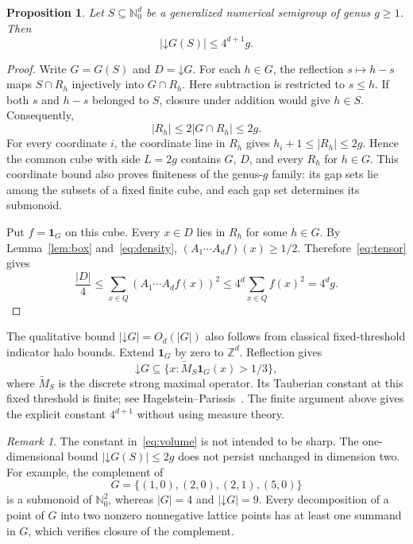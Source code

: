 \documentclass[11pt]{article}
\newtheorem{proposition}[theorem]{Proposition}
\theoremstyle{remark}
\newtheorem{remark}[theorem]{Remark}
\newcommand{\N}{\mathbb N_0}
\newcommand{\ind}{\mathbf 1}
\begin{document}
\begin{proposition}\label{prop:volume}
Let $S\subseteq\N^d$ be a generalized numerical semigroup of genus $g\ge1$.
Then
\begin{equation}\label{eq:volume}
 |\mathord\downarrow G(S)|\le4^{d+1}g.
\end{equation}
\end{proposition}
\begin{proof}
Write $G=G(S)$ and $D=\mathord\downarrow G$. For each $h\in G$,
the reflection $s\mapsto h-s$ maps $S\cap R_h$ injectively into
$G\cap R_h$. Here subtraction is restricted to $s\le h$.
If both $s$ and $h-s$ belonged to $S$, closure under addition would
give $h\in S$. Consequently,
\begin{equation}\label{eq:density}
 |R_h|\le2|G\cap R_h|\le2g.
\end{equation}
For every coordinate $i$, the coordinate line in $R_h$ gives
$h_i+1\le|R_h|\le2g$. Hence the common cube with side $L=2g$
contains $G$, $D$, and every $R_h$ for $h\in G$.
This coordinate bound also proves finiteness of the genus-$g$ family:
its gap sets lie among the subsets of a fixed finite cube, and each gap
set determines its submonoid.

Put $f=\ind_G$ on this cube. Every $x\in D$ lies in $R_h$ for some
$h\in G$. By Lemma~\ref{lem:box} and~\eqref{eq:density},
$(A_1\cdots A_d f)(x)\ge1/2$. Therefore~\eqref{eq:tensor} gives
\[
 \frac{|D|}{4}\le\sum_{x\in Q}(A_1\cdots A_d f(x))^2
 \le4^d\sum_{x\in Q}f(x)^2=4^dg.
\]
\end{proof}

The qualitative bound $|\mathord\downarrow G|=O_d(|G|)$ also follows
from classical fixed-threshold indicator halo bounds. Extend $\ind_G$
by zero to $\mathbb Z^d$. Reflection gives
\[
 \mathord\downarrow G\subseteq
 \{x:\widetilde M_S\ind_G(x)>1/3\},
\]
where $\widetilde M_S$ is the discrete strong maximal operator. Its
Tauberian constant at this fixed threshold is finite; see
Hagelstein--Parissis~\cite[Lemma~1]{HP}. The finite argument above gives
the explicit constant $4^{d+1}$ without using measure theory.

\begin{remark}\label{rem:example}
The constant in~\eqref{eq:volume} is not intended to be sharp.
The one-dimensional bound $|\mathord\downarrow G(S)|\le2g$ does not
persist unchanged in dimension two. For example, the complement of
\[
 G=\{(1,0),(2,0),(2,1),(5,0)\}
\]
is a submonoid of $\N^2$, whereas $|G|=4$ and
$|\mathord\downarrow G|=9$. Every decomposition of a point of $G$
into two nonzero nonnegative lattice points has at least one summand
in $G$, which verifies closure of the complement.
\end{remark}
\end{document}
